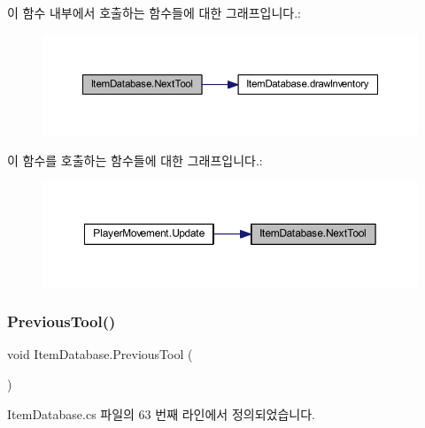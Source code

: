 이 함수 내부에서 호출하는 함수들에 대한 그래프입니다.\+:\nopagebreak
\begin{figure}[H]
\begin{center}
\leavevmode
\includegraphics[width=350pt]{d0/dc6/class_item_database_a2b0614a3fd6d0fa04b8a378156c66525_cgraph}
\end{center}
\end{figure}
이 함수를 호출하는 함수들에 대한 그래프입니다.\+:\nopagebreak
\begin{figure}[H]
\begin{center}
\leavevmode
\includegraphics[width=350pt]{d0/dc6/class_item_database_a2b0614a3fd6d0fa04b8a378156c66525_icgraph}
\end{center}
\end{figure}
\mbox{\label{class_item_database_aa47d8d6f06cb4aff0254dca75e48ec48}} 
\subsubsection{\texorpdfstring{PreviousTool()}{PreviousTool()}}
{\footnotesize\ttfamily void Item\+Database.\+Previous\+Tool (\begin{DoxyParamCaption}{ }\end{DoxyParamCaption})}



Item\+Database.\+cs 파일의 63 번째 라인에서 정의되었습니다.


